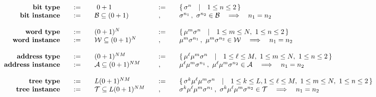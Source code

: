 \documentclass[twoside]{article}
\newcommand{\then}{\ensuremath{\quad\Longrightarrow\quad}}
\newcommand{\quadbar}{\ensuremath{\quad |\quad}}
\newcommand{\quadcomma}{\ensuremath{\quad ,\quad}}
\newcommand{\defequals}{\ensuremath{\quad :=\quad}}
\begin{document}
$$ \begin{array}{rclll}
\mbox{\bf bit type}		& \defequals & \ 0+1
				& \defequals & \{\, \sigma^n \quadbar 1\le n\le 2 \,\}							\\
\mbox{\bf bit instance}		& \defequals & \mathcal{B} \subseteq (0+1)
				& \quadcomma & \sigma^{n_1}\,,\ \sigma^{n_2} \in \mathcal{B} \then n_1 = n_2				\\
																	\\
\mbox{\bf word type}		& \defequals & (0+1)^N
				& \defequals & \{\, \mu^m\sigma^n \quadbar 1\le m\le N,\ 1\le n\le 2 \,\}				\\
\mbox{\bf word instance}	& \defequals & \mathcal{W} \subseteq (0+1)^N
				& \quadcomma & \mu^m\sigma^{n_1}\,,\ \mu^m\sigma^{n_2} \in \mathcal{W} \then n_1 = n_2			\\
																	\\
\mbox{\bf address type}		& \defequals & (0+1)^{NM}
				& \defequals & \{\, \mu^\ell\mu^m\sigma^n \quadbar 1\le \ell\le M,\ 1\le m\le N,\ 1\le n\le 2 \,\}	\\
\mbox{\bf address instance}	& \defequals & \mathcal{A} \subseteq (0+1)^{NM}
				& \quadcomma & \mu^\ell\mu^m\sigma^{n_1}\,,\ \mu^\ell\mu^m\sigma^{n_2} \in \mathcal{A} \then n_1 = n_2	\\
																	\\
\mbox{\bf tree type}		& \defequals & L(0+1)^{NM}
				& \defequals & \{\, \sigma^k\mu^\ell\mu^m\sigma^n \quadbar
					       1\le k\le L, 1\le \ell\le M,\ 1\le m\le N,\ 1\le n\le 2 \,\}				\\
\mbox{\bf tree instance}	& \defequals & \mathcal{T} \subseteq L(0+1)^{NM}
				& \quadcomma & \sigma^k\mu^\ell\mu^m\sigma^{n_1}\,,\ \sigma^k\mu^\ell\mu^m\sigma^{n_2}
					       \in \mathcal{T} \then n_1 = n_2								\\
\end{array} $$
\end{document}
